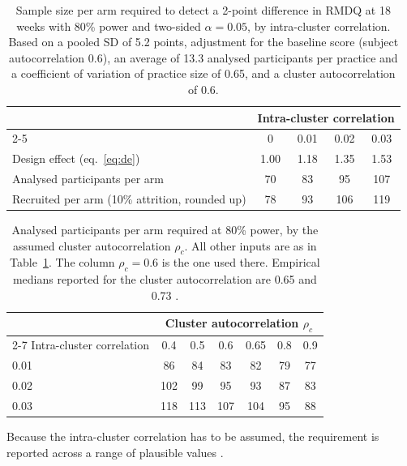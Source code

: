 \documentclass[11pt,a4paper]{article}
\begin{document}
\begin{table}[ht]
\centering\small
\caption{Sample size per arm required to detect a 2-point difference in RMDQ at
18 weeks with 80\% power and two-sided $\alpha = 0.05$, by intra-cluster
correlation. Based on a pooled SD of 5.2 points, adjustment for the baseline
score (subject autocorrelation 0.6), an average of 13.3 analysed participants per practice and a
coefficient of variation of practice size of 0.65, and a cluster
autocorrelation of 0.6.}
\label{tab:ss}
\begin{tabular}{lcccc}
\toprule
& \multicolumn{4}{c}{Intra-cluster correlation}\\
\cmidrule(l){2-5}
& 0 & 0.01 & 0.02 & 0.03\\
\midrule
Design effect (eq.~\ref{eq:de}) & 1.00 & 1.18 & 1.35 & 1.53\\
Analysed participants per arm   & 70   & 83   & 95   & 107\\
Recruited per arm (10\% attrition, rounded up) & 78 & 93 & 106 & 119\\
\bottomrule
\end{tabular}
\end{table}

\begin{table}[ht]
\centering\small
\caption{Analysed participants per arm required at 80\% power, by the
assumed cluster autocorrelation $\rho_c$. All other inputs are as in
Table~\ref{tab:ss}. The column $\rho_c = 0.6$ is the one used there.
Empirical medians reported for the cluster autocorrelation are 0.65
\citep{martin2016} and 0.73 \citep{korevaar2021}.}
\label{tab:rhoc}
\begin{tabular}{lcccccc}
\toprule
& \multicolumn{6}{c}{Cluster autocorrelation $\rho_c$}\\
\cmidrule(l){2-7}
Intra-cluster correlation & 0.4 & 0.5 & 0.6 & 0.65 & 0.8 & 0.9\\
\midrule
0.01 & 86  & 84  & 83  & 82  & 79  & 77\\
0.02 & 102 & 99  & 95  & 93  & 87  & 83\\
0.03 & 118 & 113 & 107 & 104 & 95  & 88\\
\bottomrule
\end{tabular}
\end{table}

Because the intra-cluster correlation has to be assumed, the requirement is
reported across a range of plausible values \citep{hemming2023}.
\end{document}
